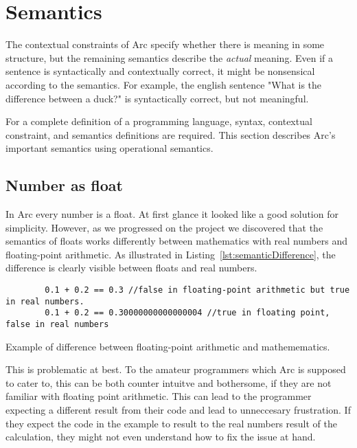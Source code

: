 \section{Semantics}\label{sec:languagesemantics}
The contextual constraints of Arc specify whether there is meaning in some structure, but the remaining semantics describe the \textit{actual} meaning. Even if a sentence is syntactically and contextually correct, it might be nonsensical according to the semantics. For example, the english sentence "What is the difference between a duck?" is syntactically correct, but not meaningful.

For a complete definition of a programming language, syntax, contextual constraint, and semantics definitions are required. This section describes Arc's important semantics using operational semantics.


\subsection{Number as float}\label{subsec:numberAsFloats}
In Arc every number is a float. At first glance it looked like a good solution for simplicity. However, as we progressed on the project we discovered that the semantics of floats works differently between mathematics with real numbers and floating-point arithmetic. As illustrated in Listing~\ref{lst:semanticDifference}, the difference is clearly visible between floats and real numbers.


\begin{listing}[htb!]
    \begin{verbatim}
        0.1 + 0.2 == 0.3 //false in floating-point arithmetic but true in real numbers.
        0.1 + 0.2 == 0.30000000000000004 //true in floating point, false in real numbers
    \end{verbatim}
    \caption{Example of difference between floating-point arithmetic and mathemematics.}
    \label{lst:semanticDifference}
\end{listing}


This is problematic at best. To the amateur programmers which Arc is supposed to cater to, this can be both counter intuitve and bothersome, if they are not familiar with floating point arithmetic. This can lead to the programmer expecting a different result from their code and lead to unneccesary frustration. If they expect the code in the example to result to the real numbers result of the calculation, they might not even understand how to fix the issue at hand.

